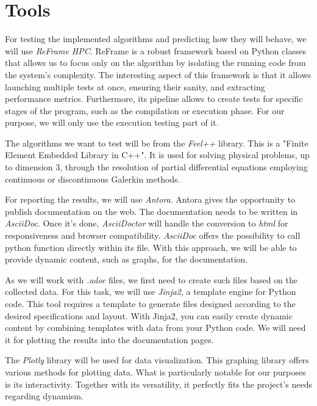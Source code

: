 \documentclass[12pt]{article}
\begin{document}
\newpage
\section{Tools}

For testing the implemented algorithms and predicting how they will behave, we will use \textit{ReFrame HPC}\cite*{ReFrame}.
ReFrame is a robust framework based on Python classes that allows us to focus only on the algorithm by isolating the running code from the system's complexity.
The interesting aspect of this framework is that it allows launching multiple tests at once, ensuring their sanity, and extracting performance metrics.
Furthermore, its pipeline allows to create tests for specific stages of the program, such as the compilation or execution phase. 
For our purpose, we will only use the execution testing part of it.

The algorithms we want to test will be from the \textit{Feel++}\cite*{Feel++} library.
This is a "Finite Element Embedded Library in C++". It is used for solving physical problems, up to dimension 3,
through the resolution of partial differential equations employing continuous or discontinuous Galerkin methods. 

For reporting the results, we will use \textit{Antora}\cite*{Antora}. Antora gives the opportunity to publish documentation on the web.
The documentation needs to be written in \textit{AsciiDoc}. Once it's done, \textit{AsciiDoctor} will handle the conversion to \textit{html}
for responsiveness and browser compatibility.
\textit{AsciiDoc} offers the possibility to call python function directly within its file. With this approach, we will be able to provide dynamic content,
such as graphs, for the documentation.

As we will work with \textit{.adoc} files, we first need to create such files based on the collected data.
For this task, we will use \textit{Jinja2}\cite*{Jinja2}, a template engine for Python code.
This tool requires a template to generate files designed according to the desired specifications and layout.
With Jinja2, you can easily create dynamic content by combining templates with data from your Python code.
We will need it for plotting the results into the documentation pages.


The \textit{Plotly}\cite*{Plotly} library will be used for data visualization. This graphing library offers various methods for plotting data.
What is particularly notable for our purposes is its interactivity. Together with its versatility, it perfectly fits the project's needs
regarding dynamism.
\end{document}
